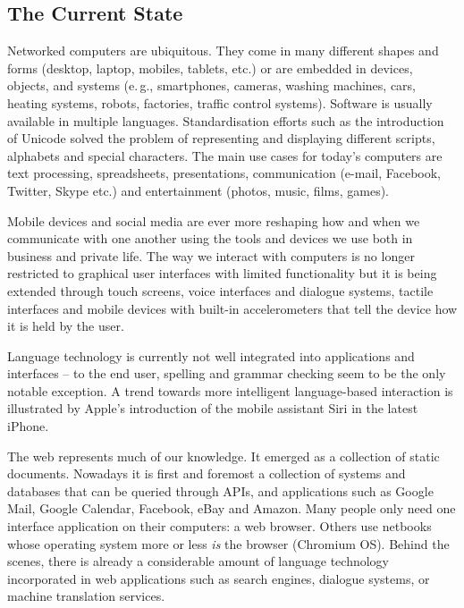 \documentclass[10pt, plain]{../../metanetpaper}
\begin{document}
\begin{multicols}{2}

\subsection{The Current State}
\label{sec:ict-trends}

Networked computers are ubiquitous. They come in many different shapes and forms (desktop, laptop, mobiles, tablets, etc.) or are embedded in devices, objects, and systems (e.\,g., smartphones, cameras, washing machines, cars, heating systems, robots, factories, traffic control systems). Software is usually available in multiple languages. Standardisation efforts such as the introduction of Unicode solved the problem of representing and displaying different scripts, alphabets and special characters. The main use cases for today's computers are text processing, spreadsheets, presentations, communication (e-mail, Facebook, Twitter, Skype etc.) and entertainment (photos, music, films, games).

Mobile devices and social media are ever more reshaping how and when we communicate with one another using the tools and devices we use both in business and private life. The way we interact with computers is no longer restricted to graphical user interfaces with limited functionality but it is being extended through touch screens, voice interfaces and dialogue systems, tactile interfaces and mobile devices with built-in accelerometers that tell the device how it is held by the user.

Language technology is currently not well integrated into applications and interfaces -- to the end user, spelling and grammar checking seem to be the only notable exception. A trend towards more intelligent language-based interaction is illustrated by Apple’s introduction of the mobile assistant Siri in the latest iPhone.

The web represents much of our knowledge. It emerged as a collection of static documents. Nowadays it is first and foremost a collection of systems and databases that can be queried through APIs, and applications such as Google Mail, Google Calendar, Facebook, eBay and Amazon. Many people only need one interface application on their computers: a web browser. Others use netbooks whose operating system more or less \emph{is} the browser (Chromium OS). Behind the scenes, there is already a considerable amount of language technology incorporated in web applications such as search engines, dialogue systems, or machine translation services.


\end{multicols}
\end{document}
